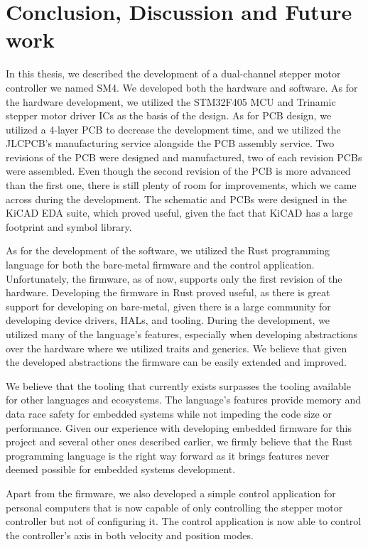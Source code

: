\chapter*{Conclusion, Discussion and Future work}
{}
In this thesis, we described the development of a dual-channel stepper motor controller we named SM4.
We developed both the hardware and software.
As for the hardware development, we utilized the STM32F405 MCU and Trinamic stepper motor driver ICs as the basis of the design.
As for PCB design, we utilized a 4-layer PCB to decrease the development time, and we utilized the JLCPCB's manufacturing service alongside the PCB assembly service.
Two revisions of the PCB were designed and manufactured, two of each revision PCBs were assembled.
Even though the second revision of the PCB is more advanced than the first one, there is still plenty of room for improvements, which we came across during the development.
The schematic and PCBs were designed in the KiCAD EDA suite, which proved useful, given the fact that KiCAD has a large footprint and symbol library.

As for the development of the software, we utilized the Rust programming language for both the bare-metal firmware and the control application.
Unfortunately, the firmware, as of now, supports only the first revision of the hardware.
Developing the firmware in Rust proved useful, as there is great support for developing on bare-metal, given there is a large community for developing device drivers, HALs, and tooling.
During the development, we utilized many of the language's features, especially when developing abstractions over the hardware where we utilized traits and generics.
We believe that given the developed abstractions the firmware can be easily extended and improved.

We believe that the tooling that currently exists surpasses the tooling available for other languages and ecosystems.
The language's features provide memory and data race safety for embedded systems while not impeding the code size or performance.
Given our experience with developing embedded firmware for this project and several other ones described earlier, we firmly believe that the Rust programming language is the right way forward as it brings features never deemed possible for embedded systems development.

Apart from the firmware, we also developed a simple control application for personal computers that is now capable of only controlling the stepper motor controller but not of configuring it.
The control application is now able to control the controller's axis in both velocity and position modes.

